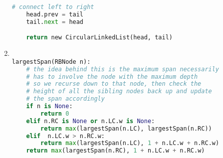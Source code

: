 \documentclass{article}
\begin{document}
\begin{enumerate}
\begin{lstlisting}[language=Python]
    # connect left to right
    head.prev = tail
    tail.next = head

    return new CircularLinkedList(head, tail)


\end{lstlisting}

\item


\begin{lstlisting}[language=Python]

largestSpan(RBNode n):
    # the idea behind this is the maximum span necessarily
    # has to involve the node with the maximum depth
    # so we recurse down to that node, then check the 
    # height of all the sibling nodes back up and update 
    # the span accordingly
    if n is None:
        return 0
    elif n.RC is None or n.LC.w is None:
        return max(largestSpan(n.LC), largestSpan(n.RC))
    elif  n.LC.w > n.RC.w:
        return max(largestSpan(n.LC), 1 + n.LC.w + n.RC.w)
    return max(largestSpan(n.RC), 1 + n.LC.w + n.RC.w)
        
    

\end{lstlisting}


    
    
\end{enumerate}

\begin{lstlisting}[language=Java]

\end{lstlisting}
\end{document}
